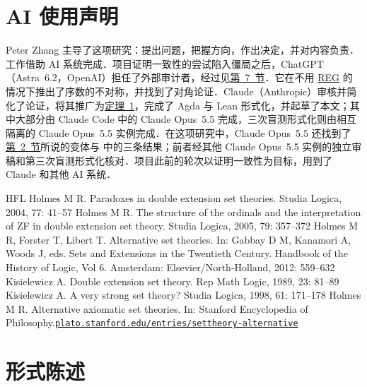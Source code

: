 \documentclass{article}
\makeatletter
\let\zhorighyperref\hyperref
\renewcommand{\hyperref}[2][]{\zhorighyperref[#1]{\mbox{#2}}}
\newcommand{\needspace}[1]{}
\newcommand{\icode}[1]{\lxWithClass{icode}{\texttt{#1}}}
\newcommand{\ctexset}[1]{}
\newcommand{\zihao}[1]{}
\newcommand{\needspace}[1]{\par\penalty-100\begingroup\setlength{\dimen@}{#1}%
  \dimen@ii\pagegoal\advance\dimen@ii-\pagetotal
  \ifdim\dimen@>\dimen@ii\ifdim\dimen@ii>\z@\vfil\fi\break\fi\endgroup}
\newcommand{\icode}[1]{\ifhmode\unskip\allowbreak\hskip 0.25em plus 0.1em\relax\else\leavevmode\fi
  {\setlength{\fboxsep}{1.2pt}\colorbox{shadecolor}{\texttt{\vphantom{Ay}#1}}}%
  \futurelet\@let@token\icode@after}
\newcommand{\icode@after}{\@tempswatrue
  \ifx\@let@token，\@tempswafalse\fi \ifx\@let@token．\@tempswafalse\fi
  \ifx\@let@token、\@tempswafalse\fi \ifx\@let@token；\@tempswafalse\fi
  \ifx\@let@token：\@tempswafalse\fi \ifx\@let@token）\@tempswafalse\fi
  \if@tempswa\allowbreak\hskip 0.25em plus 0.1em\relax\fi\ignorespaces}
\theoremstyle{zh}
\newcommand{\REG}{\textup{REG}}
\makeatother
\begin{document}
\section*{AI 使用声明}

Peter Zhang 主导了这项研究：提出问题，把握方向，作出决定，并对内容负责．工作借助 AI 系统完成．项目证明一致性的尝试陷入僵局之后，ChatGPT（Astra~6.2，OpenAI）担任了外部审计者，经过见\hyperref[sec:7]{第 7 节}．它在不用 \hyperref[ax:REG]{\REG}{} 的情况下推出了序数的不对称，并找到了对角论证．Claude（Anthropic）审核并简化了论证，将其推广为\hyperref[thm:1]{定理~1}，完成了 Agda 与 Lean 形式化，并起草了本文；其中大部分由 Claude Code 中的 Claude Opus~5.5 完成，三次盲测形式化则由相互隔离的 Claude Opus~5.5 实例完成．在这项研究中，Claude Opus~5.5 还找到了\hyperref[sec:2]{第 2 节}所说的变体与 \icode{agda/Supplement.agda} 中的三条结果；前者经其他 Claude Opus~5.5 实例的独立审稿和第三次盲测形式化核对．项目此前的轮次以证明一致性为目标，用到了 Claude 和其他 AI 系统．

\begingroup\zihao{-5}
\begin{thebibliography}{HFL}\setlength{\itemsep}{0pt}\setlength{\parsep}{0pt}
 Holmes M R. Paradoxes in double extension set theories. Studia Logica, 2004, 77: 41--57
 Holmes M R. The structure of the ordinals and the interpretation of ZF in double extension set theory. Studia Logica, 2005, 79: 357--372
 Holmes M R, Forster T, Libert T. Alternative set theories. In: Gabbay D M, Kanamori A, Woods J, eds. Sets and Extensions in the Twentieth Century. Handbook of the History of Logic, Vol 6. Amsterdam: Elsevier/North-Holland, 2012: 559--632
 Kisielewicz A. Double extension set theory. Rep Math Logic, 1989, 23: 81--89
 Kisielewicz A. A very strong set theory? Studia Logica, 1998, 61: 171--178
 Holmes M R. Alternative axiomatic set theories. In: Stanford Encyclopedia of Philosophy.\newline \href{https://plato.stanford.edu/entries/settheory-alternative/}{\texttt{plato.stanford.edu/entries/settheory-alternative}}
\end{thebibliography}
\endgroup

\appendix
\ctexset{section/name = {附录,}}
\needspace{10\baselineskip}
\section{形式陈述}\label{app:formal}


\end{document}
